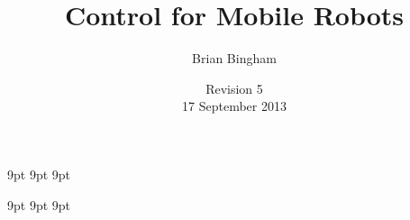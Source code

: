 \documentclass[11pt]{book}
\begin{document}
\newif\ifsolutions

\graphicspath{{./}{../figs/}}

%

\newcommand{\bmcode}{\begin{lstlisting}[style=myMatStyle]}
\newcommand{\emcode}{\end{lstlisting}}

\newcommand{\SF}{0.2}
\newcommand{\SFb}{0.3}

\newcommand{\FigWidth}{0.7}
\newcommand{\ThisFigWidth}{0.7}

\newcommand{\scaleOneTwo}[2] {\scalebox{#2}}

\graphicspath{{../figs/}}


     {9pt}%
     {9pt}%
     {\itshape}%
     {}%
     {\bfseries}%
     {}%
     {9pt}%
     {}%


\theoremstyle{myex}
\newtheorem{ex}{Exercise}[chapter]

     {9pt}%
     {9pt}%
     {\itshape}%
     {}%
     {\bfseries}%
     {}%
     {9pt}%
     {}%

\theoremstyle{mysoln}
\newtheorem*{soln}{Solution}

\frontmatter
\ifsolutions
\newcommand{\thetitle}{Control for Mobile Robots \\ WITH SOLUTIONS}
\else
\newcommand{\thetitle}{Control for Mobile Robots}
\fi
\title{\thetitle}
\author{Brian Bingham}
\date{Revision 5\\17 September 2013}
\end{document}
